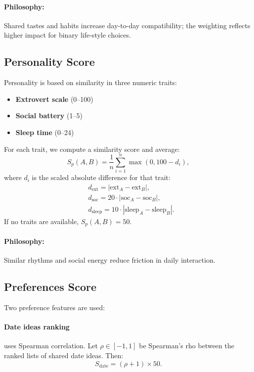 \documentclass[11pt]{article}
\begin{document}
\paragraph{Philosophy:} Shared tastes and habits increase day-to-day compatibility; the weighting reflects higher impact for binary life-style choices.

\subsection{Personality Score}
Personality is based on similarity in three numeric traits:
\begin{itemize}[leftmargin=*]
    \item \textbf{Extrovert scale} (0--100)
    \item \textbf{Social battery} (1--5)
    \item \textbf{Sleep time} (0--24)
\end{itemize}

For each trait, we compute a similarity score and average:
\[
S_p(A,B) = \frac{1}{n} \sum_{i=1}^{n} \max(0, 100 - d_i),
\]
where $d_i$ is the scaled absolute difference for that trait:
\[
\begin{aligned}
&d_{\text{ext}} = |\text{ext}_A - \text{ext}_B|, \\
&d_{\text{soc}} = 20 \cdot |\text{soc}_A - \text{soc}_B|, \\
&d_{\text{sleep}} = 10 \cdot |\text{sleep}_A - \text{sleep}_B|.
\end{aligned}
\]
If no traits are available, $S_p(A,B)=50$.

\paragraph{Philosophy:} Similar rhythms and social energy reduce friction in daily interaction.

\subsection{Preferences Score}
Two preference features are used:

\paragraph{Date ideas ranking} uses Spearman correlation.
Let $\rho \in [-1,1]$ be Spearman's rho between the ranked lists of shared date ideas. Then:
\[
S_{\text{date}} = (\rho + 1) \times 50.
\]
\end{document}
